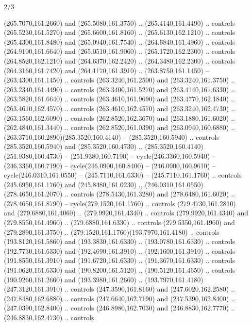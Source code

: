 \begin{flagdescription}{2/3}
\begin{scope}[xshift=0.5\flaglength,yshift=0.5\flagwidth,scale=\flagwidth/259.2]
\begin{scope}[y=0.8pt, x=0.8pt, yscale=-1,shift={(-243,-162)}]
      (265.7070,161.2660) and (265.5080,161.3750) .. (265.4140,161.4490) .. controls
      (265.5230,161.5270) and (265.6600,161.8160) .. (265.6130,162.1210) .. controls
      (265.4300,161.8480) and (265.0940,161.7540) .. (264.6840,161.4960) .. controls
      (264.9100,161.6640) and (265.0510,161.9060) .. (265.1720,162.2300) .. controls
      (264.8520,162.1210) and (264.6370,162.2420) .. (264.3480,162.2300) .. controls
      (264.3160,161.7420) and (264.1170,161.3910) .. (263.8750,161.1450) --
      (263.4300,161.1450) .. controls (263.3240,161.2500) and (263.3240,161.3750) ..
      (263.2340,161.4490) .. controls (263.3400,161.5270) and (263.4140,161.6330) ..
      (263.5820,161.6640) .. controls (263.4610,161.9690) and (263.4770,162.1840) ..
      (263.4610,162.4570) .. controls (263.4610,162.4570) and (263.3240,162.4730) ..
      (263.1560,162.6090) .. controls (262.8520,162.3670) and (263.1880,161.6020) ..
      (262.4840,161.3440) .. controls (262.8520,161.0390) and (263.0940,160.6880) ..
      (263.3710,160.2890)(285.3520,160.4140) -- (285.3520,160.5940) .. controls
      (285.3520,160.5940) and (285.3520,160.4730) ..
      (285.3520,160.4140)(251.9380,160.4730) -- (251.9380,160.7190) --
      cycle(246.3360,160.5940) -- (246.3360,160.7190) -- cycle(246.0900,160.8400) --
      (246.0900,160.9610) -- cycle(246.0310,161.0550) -- (245.7110,161.6330) --
      (245.7110,161.1760) .. controls (245.6950,161.1760) and (245.8480,161.0230) ..
      (246.0310,161.0550)(278.4650,161.2070) .. controls (278.5430,161.3280) and
      (278.6480,161.6020) .. (278.4650,161.8790) -- cycle(279.1520,161.1760) ..
      controls (279.4730,161.2810) and (279.6880,161.4060) .. (279.9920,161.4340) ..
      controls (279.9920,161.4340) and (279.8550,161.4960) .. (279.6880,161.6330) ..
      controls (279.5350,161.4960) and (279.2890,161.3750) ..
      (279.1520,161.1760)(193.7970,161.4180) .. controls (193.8120,161.5860) and
      (193.3830,161.6330) .. (193.0780,161.6330) .. controls (192.7730,161.6330) and
      (192.4690,161.3910) .. (192.1600,161.3910) .. controls (191.8550,161.3910) and
      (191.6720,161.6330) .. (191.3670,161.6330) .. controls (191.0620,161.6330) and
      (190.8200,161.5120) .. (190.5120,161.4650) .. controls (190.9260,161.2660) and
      (193.3980,161.2660) .. (193.7970,161.4180)(247.3120,161.3910) .. controls
      (247.3590,161.8160) and (247.6020,162.2580) .. (247.8480,162.6880) .. controls
      (247.6640,162.7190) and (247.5390,162.8400) .. (247.0390,162.8400) .. controls
      (246.8980,162.7030) and (246.8830,162.7770) .. (246.8830,162.4730) .. controls

\end{scope}
\end{scope}
\end{flagdescription}
